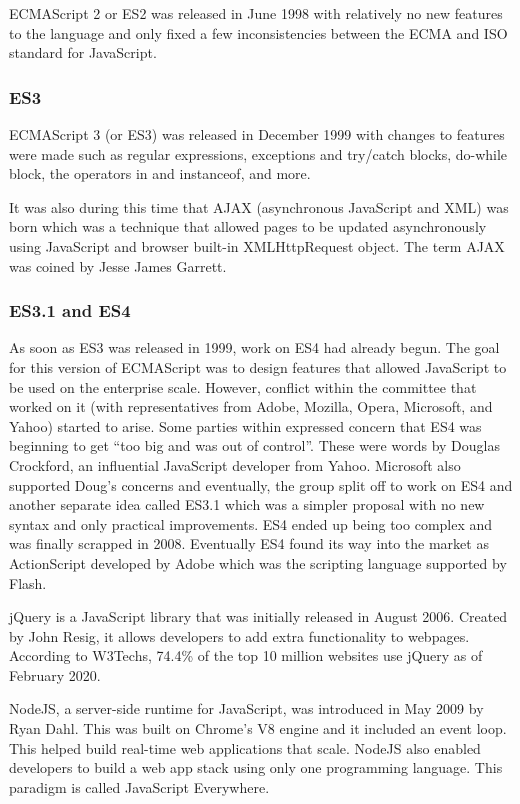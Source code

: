 \documentclass{article}
\begin{document}
    ECMAScript 2 or ES2 was released in June 1998 with relatively no new
    features to the language and only fixed a few inconsistencies between the
    ECMA and ISO standard for JavaScript.

    \subsubsection{ES3}
    ECMAScript 3 (or ES3) was released in December 1999 with changes to features
    were made such as regular expressions, exceptions and try/catch blocks,
    do-while block, the operators in and instanceof, and more.

    It was also during this time that AJAX (asynchronous JavaScript and XML) was
    born which was a technique that allowed pages to be updated asynchronously
    using JavaScript and browser built-in XMLHttpRequest object. The term AJAX
    was coined by Jesse James Garrett.

    \subsubsection{ES3.1 and ES4}
    As soon as ES3 was released in 1999, work on ES4 had already begun. The goal
    for this version of ECMAScript was to design features that allowed
    JavaScript to be used on the enterprise scale. However, conflict within the
    committee that worked on it (with representatives from Adobe, Mozilla,
    Opera, Microsoft, and Yahoo) started to arise. Some parties within expressed
    concern that ES4 was beginning to get “too big and was out of control”.
    These were words by Douglas Crockford, an influential JavaScript developer
    from Yahoo. Microsoft also supported Doug’s concerns and eventually, the
    group split off to work on ES4 and another separate idea called ES3.1 which
    was a simpler proposal with no new syntax and only practical improvements.
    ES4 ended up being too complex and was finally scrapped in 2008. Eventually
    ES4 found its way into the market as ActionScript developed by Adobe which
    was the scripting language supported by Flash.

    jQuery is a JavaScript library that was initially released in August 2006.
    Created by John Resig, it allows developers to add extra functionality to
    webpages. According to W3Techs, 74.4\% of the top 10 million websites use
    jQuery as of February 2020.

    NodeJS, a server-side runtime for JavaScript, was introduced in May 2009 by
    Ryan Dahl. This was built on Chrome’s V8 engine and it included an event
    loop. This helped build real-time web applications that scale. NodeJS also
    enabled developers to build a web app stack using only one programming
    language. This paradigm is called JavaScript Everywhere.
\end{document}
